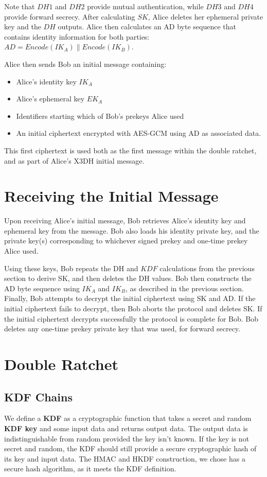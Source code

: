 Note that $DH1$ and $DH2$ provide mutual authentication, while $DH3$ and $DH4$ provide forward secrecy. After calculating $SK$, Alice deletes her ephemeral private key and the $DH$ outputs. Alice then calculates an AD byte sequence that contains identity information for both parties: $AD = Encode(IK_A) \| Encode(IK_B)$.

Alice then sends Bob an initial message containing:

\begin{itemize}
  \item Alice's identity key $IK_A$
  \item Alice's ephemeral key $EK_A$
  \item Identifiers starting which of Bob's prekeys Alice used
  \item An initial ciphertext encrypted with AES-GCM using AD as associated data.
\end{itemize}

This first ciphertext is used both as the first message within the double ratchet, and as part of Alice's X3DH initial message.

\section{Receiving the Initial Message}
\label{sec:ReceivingTheInitialMessage}

Upon receiving Alice's initial message, Bob retrieves Alice's identity key and ephemeral key from the message. Bob also loads his identity private key, and the private key(s) corresponding to whichever signed prekey and one-time prekey Alice used.

Using these keys, Bob repeats the DH and $KDF$ calculations from the previous section to derive SK, and then deletes the DH values. Bob then constructs the AD byte sequence using $IK_A$ and $IK_B$, as described in the previous section. Finally, Bob attempts to decrypt the initial ciphertext using SK and AD. If the initial ciphertext fails to decrypt, then Bob aborts the protocol and deletes SK. If the initial ciphertext decrypts successfully the protocol is complete for Bob. Bob deletes any one-time prekey private key that was used, for forward secrecy.

\section{Double Ratchet}
\label{sec:DoubleRatchet}

\subsection{KDF Chains}
\label{subsec:KDF Chains}
We define a \textbf{KDF} as a cryptographic function that takes a secret and random \textbf{KDF key} and some input data and returns output data. The output data is indistinguishable from random provided the key isn't known. If the key is not secret and random, the KDF should still provide a secure cryptographic hash of its key and input data. The HMAC and HKDF construction, we chose has a secure hash algorithm, as it meets the KDF definition.

